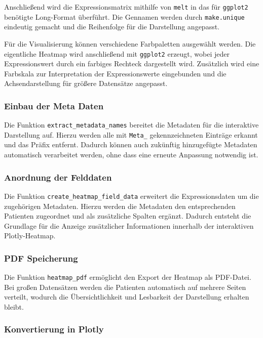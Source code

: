 \documentclass[12pt]{article}
\begin{document}
Anschließend wird die Expressionsmatrix mithilfe von \texttt{melt} in das für \texttt{ggplot2} benötigte Long-Format überführt. Die Gennamen werden durch \texttt{make.unique} eindeutig gemacht und die Reihenfolge für die Darstellung angepasst.

Für die Visualisierung können verschiedene Farbpaletten ausgewählt werden. Die eigentliche Heatmap wird anschließend mit \texttt{ggplot2} erzeugt, wobei jeder Expressionswert durch ein farbiges Rechteck dargestellt wird. Zusätzlich wird eine Farbskala zur Interpretation der Expressionswerte eingebunden und die Achsendarstellung für größere Datensätze angepasst.

\subsubsection{Einbau der Meta Daten}

Die Funktion \texttt{extract\_metadata\_names} bereitet die Metadaten für die interaktive Darstellung auf. Hierzu werden alle mit \texttt{Meta\_} gekennzeichneten Einträge erkannt und das Präfix entfernt. Dadurch können auch zukünftig hinzugefügte Metadaten automatisch verarbeitet werden, ohne dass eine erneute Anpassung notwendig ist.

\subsubsection{Anordnung der Felddaten}

Die Funktion \texttt{create\_heatmap\_field\_data} erweitert die Expressionsdaten um die zugehörigen Metadaten. Hierzu werden die Metadaten den entsprechenden Patienten zugeordnet und als zusätzliche Spalten ergänzt. Dadurch entsteht die Grundlage für die Anzeige zusätzlicher Informationen innerhalb der interaktiven Plotly-Heatmap.

\subsubsection{PDF Speicherung}

Die Funktion \texttt{heatmap\_pdf} ermöglicht den Export der Heatmap als PDF-Datei. Bei großen Datensätzen werden die Patienten automatisch auf mehrere Seiten verteilt, wodurch die Übersichtlichkeit und Lesbarkeit der Darstellung erhalten bleibt.

\subsubsection{Konvertierung in Plotly}
\end{document}
